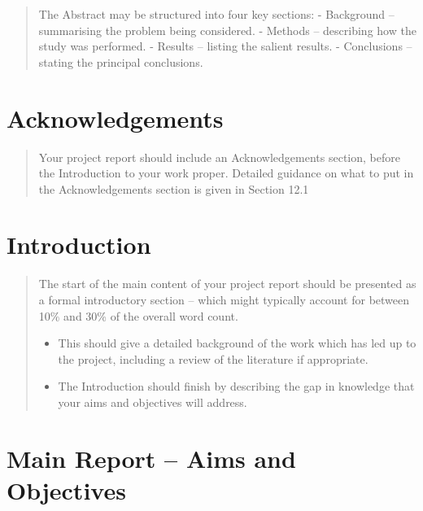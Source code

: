 \documentclass[
  11pt,
  a4paper,
]{scrreprt}
\begin{document}
\begin{quote}
The Abstract may be structured into four key sections: - Background --
summarising the problem being considered. - Methods -- describing how
the study was performed. - Results -- listing the salient results. -
Conclusions -- stating the principal conclusions.
\end{quote}


\chapter*{Acknowledgements}\label{acknowledgements}


\begin{quote}
Your project report should include an Acknowledgements section, before
the Introduction to your work proper. Detailed guidance on what to put
in the Acknowledgements section is given in Section 12.1
\end{quote}


\chapter{Introduction}\label{introduction}

\begin{quote}
The start of the main content of your project report should be presented
as a formal introductory section -- which might typically account for
between 10\% and 30\% of the overall word count.

\begin{itemize}
\item
  This should give a detailed background of the work which has led up to
  the project, including a review of the literature if appropriate.
\item
  The Introduction should finish by describing the gap in knowledge that
  your aims and objectives will address.
\end{itemize}
\end{quote}


\chapter{Main Report -- Aims and
Objectives}\label{main-report-aims-and-objectives}
\end{document}
